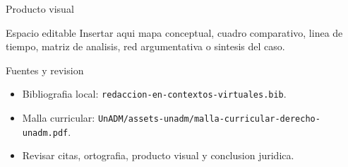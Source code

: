 \documentclass[
  spanish,
  aspectratio=169,
  xcolor={dvipsnames,table}
]{beamer}
\begin{document}
\begin{frame}{Producto visual}
  \begin{block}{Espacio editable}
    Insertar aqui mapa conceptual, cuadro comparativo, linea de tiempo,
    matriz de analisis, red argumentativa o sintesis del caso.
  \end{block}
  \centering
\end{frame}

\begin{frame}{Fuentes y revision}
  \begin{itemize}
    \item Bibliografia local: \texttt{redaccion-en-contextos-virtuales.bib}.
    \item Malla curricular: \texttt{UnADM/assets-unadm/malla-curricular-derecho-unadm.pdf}.
    \item Revisar citas, ortografia, producto visual y conclusion juridica.
  \end{itemize}
\end{frame}
\end{document}
